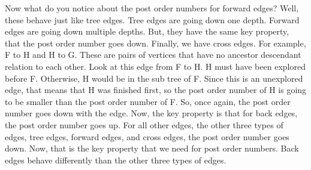 Now what do you notice about the post order numbers for forward edges? Well, these behave just like tree edges.
Tree edges are going down one depth.
Forward edges are going down multiple depths.
But, they have the same key property, that the post order number goes down.
Finally, we have cross edges.
For example, F to H and H to G\@.
These are pairs of vertices that have no ancestor descendant relation to each other.
Look at this edge from F to H\@.
H must have been explored before F\@.
Otherwise, H would be in the sub tree of F\@.
Since this is an unexplored edge, that means that H was finished first, so the post order number of H is going to be smaller than the post order number of F\@.
So, once again, the post order number goes down with the edge.
Now, the key property is that for back edges, the post order number goes up.
For all other edges, the other three types of edges, tree edges, forward edges, and cross edges, the post order number goes down.
Now, that is the key property that we need for post order numbers.
Back edges behave differently than the other three types of edges.

